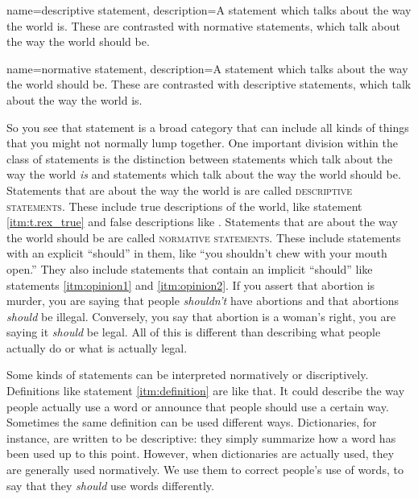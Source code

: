 {
name=descriptive statement,
description={A statement which talks about the way the world is. These are contrasted with normative statements, which talk about the way the world should be.}
}


{
name=normative statement,
description={A statement which talks about the way the world should be. These are contrasted with descriptive statements, which talk about the way the world is.}
}



So you see that statement is a broad category that can include all kinds of things that you might not normally lump together. One important division within the class of statements is the distinction between statements which talk about the way the world \textit{is} and statements which talk about the way the world should be. Statements that are about the way the world is are called \textsc{\glspl{descriptive statement}}\label{def:descriptive_statement}. These include true descriptions of the world, like statement \ref{itm:t.rex_true} and false descriptions like \label{itm:silly}. Statements that are about the way the world should be are called \textsc{\glspl{normative statement}}\label{def:normative_statement}. These include statements with an explicit ``should'' in them, like ``you shouldn't chew with your mouth open.'' They also include statements that contain an implicit ``should'' like statements  \ref{itm:opinion1} and \ref{itm:opinion2}. If you assert that abortion is murder, you are saying that people \textit{shouldn't} have abortions and that abortions \textit{should} be illegal. Conversely, you say that abortion is a woman's right, you are saying it \textit{should} be legal. All of this is different than describing what people actually do or what is actually legal. 

Some kinds of statements can be interpreted normatively or discriptively. Definitions like statement \ref{itm:definition} are like that. It could describe the way people actually use a word or announce that people should use a certain way. Sometimes the same definition can be used different ways. Dictionaries, for instance, are written to be descriptive: they simply summarize how a word has been used up to this point. However, when dictionaries are actually used, they are generally used normatively. We use them to correct people's use of words, to say that they \textit{should} use words differently.

